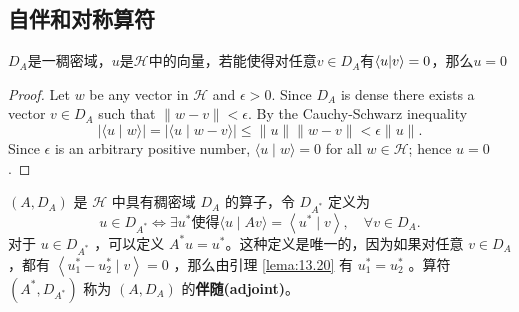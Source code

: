 \subsection{自伴和对称算符}
\begin{lemma}\label{lema:13.20}
    \(D_A\)是一稠密域，\(u\)是\(\mathcal{H}\)中的向量，若能使得对任意\(v \in D_A\)有\(\braket{u|v}=0\)，那么\(u=0\)
\end{lemma}
\begin{proof}
    Let \(w\) be any vector in \(\mathcal{H}\) and \(\epsilon>0\). Since \(D_{A}\) is dense there exists a vector \(v \in D_{A}\) such that \(\|w-v\|<\epsilon\). By the Cauchy-Schwarz inequality
\[
|\langle u \mid w\rangle|=|\langle u \mid w-v\rangle| \leq\|u\|\|w-v\|<\epsilon\|u\| .
\]
Since \(\epsilon\) is an arbitrary positive number, \(\langle u \mid w\rangle=0\) for all \(w \in \mathcal{H}\); hence \(u=0\).\qedhere
\end{proof}
\(\left(A, D_{A}\right)\) 是 \(\mathcal{H}\) 中具有稠密域 \(D_{A}\) 的算子，令 \(D_{A^ {*}}\) 定义为
\[
u \in D_{A^{*}} \Longleftrightarrow \exists u^{*} \text {使得}\langle u \mid A v\rangle=\left\langle u^{*} \mid v\right\rangle, \quad \forall v \in D_{A} .
\]
对于 \(u \in D_{A^{*}}\) ，可以定义 \(A^{*} u=u^{*}\)。这种定义是唯一的，因为如果对任意 \(v \in D_{ A}\)，都有 \(\left\langle u_{1}^{*}-u_{2}^{*} \mid v\right\rangle=0\) ，那么由引理 \ref{lema:13.20} 有 \(u_{1}^{*}=u_{2}^{*}\) 。算符 \(\left(A^{*}, D_{A^{*}}\right)\) 称为 \(\left(A, D_{A}\right)\) 的\textbf{伴随(adjoint)}。

